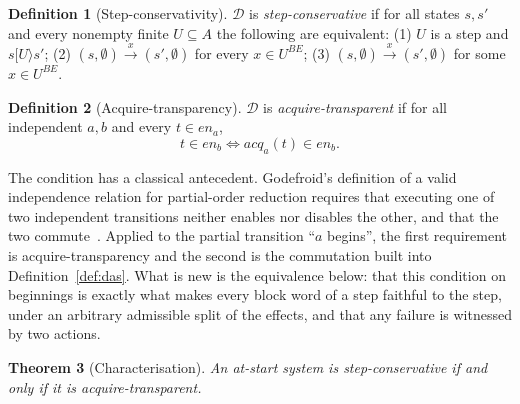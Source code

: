 \documentclass[preprint,12pt]{elsarticle}
\theoremstyle{plain}
\newtheorem{theorem}{Theorem}[section]
\theoremstyle{definition}
\newtheorem{definition}[theorem]{Definition}
\newcommand{\en}{\mathit{en}}
\newcommand{\acq}{\mathit{acq}}
\newcommand{\steparrow}[1]{\mathrel{[#1\rangle}}
\newcommand{\istep}[1]{\xrightarrow{#1}}
\newcommand{\BE}[1]{#1^{\mathit{BE}}}
\newcommand{\D}{\mathcal{D}}
\begin{document}
\begin{definition}[Step-conservativity]
\label{def:conservative}
$\D$ is \emph{step-conservative} if for all states $s, s'$ and every nonempty finite $U \subseteq A$ the following are equivalent:
(1) $U$ is a step and $s \steparrow{U} s'$;
(2) $(s, \emptyset) \istep{x} (s', \emptyset)$ for every $x \in \BE{U}$;
(3) $(s, \emptyset) \istep{x} (s', \emptyset)$ for some $x \in \BE{U}$.
\end{definition}

\begin{definition}[Acquire-transparency]
\label{def:transparent}
$\D$ is \emph{acquire-transparent} if for all independent $a, b$ and every $t \in \en_a$,
\[
t \in \en_b \iff \acq_a(t) \in \en_b .
\]
\end{definition}

The condition has a classical antecedent. Godefroid's definition of a valid independence relation for partial-order reduction requires that executing one of two independent transitions neither enables nor disables the other, and that the two commute~\cite{Godefroid1996}. Applied to the partial transition ``$a$ begins'', the first requirement is acquire-transparency and the second is the commutation built into Definition~\ref{def:das}. What is new is the equivalence below: that this condition on beginnings is exactly what makes every block word of a step faithful to the step, under an arbitrary admissible split of the effects, and that any failure is witnessed by two actions.

\begin{theorem}[Characterisation]
\label{thm:A-char}
An at-start system is step-conservative if and only if it is acquire-transparent.
\end{theorem}
\end{document}
